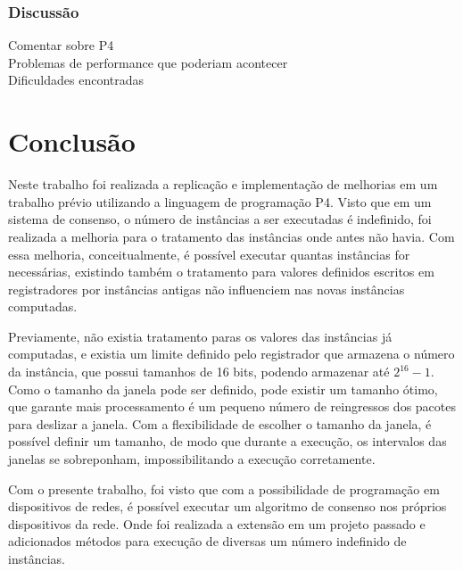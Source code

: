 \documentclass[
    12pt,
    openright, 
    oneside,
    a4paper,
    french,
    english,
    brazil
    ]{facom-ufu-abntex2}
\theoremstyle{definition}
\begin{document}
\subsection{Discussão}

\begin{center}
    Comentar sobre P4\\
    Problemas de performance que poderiam acontecer\\
    Dificuldades encontradas \\
\end{center}

\chapter{Conclusão}
Neste trabalho foi realizada a replicação e implementação de melhorias em um trabalho prévio \cite{dang2016paxos} utilizando
a linguagem de programação P4. Visto que em um sistema de consenso, o número de instâncias a ser executadas é indefinido, foi realizada
a melhoria para o tratamento das instâncias onde antes não havia. Com essa melhoria, conceitualmente, é possível executar
quantas instâncias for necessárias, existindo também o tratamento para valores definidos escritos em registradores por instâncias
antigas não influenciem nas novas instâncias computadas.

Previamente, não existia tratamento paras os valores das instâncias já computadas, e existia um limite definido pelo registrador
que armazena o número da instância, que possui tamanhos de 16 bits, podendo armazenar até $2^{16} - 1$. Como o tamanho da janela pode
ser definido, pode existir um tamanho ótimo, que garante mais processamento é um pequeno número de reingressos dos pacotes para
deslizar a janela. Com a flexibilidade de escolher o tamanho da janela, é possível definir um tamanho, de modo que durante a execução,
os intervalos das janelas se sobreponham, impossibilitando a execução corretamente.

Com o presente trabalho, foi visto que com a possibilidade de programação em dispositivos de redes, é possível executar um algoritmo
de consenso nos próprios dispositivos da rede. Onde foi realizada a extensão em um projeto passado e adicionados métodos para execução
de diversas um número indefinido de instâncias. 


\end{document}
